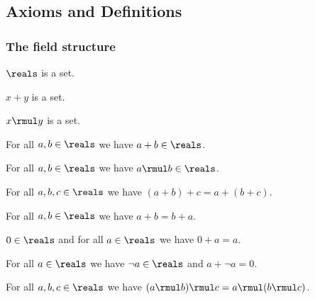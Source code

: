 \subsection{Axioms and Definitions}

\subsubsection{The field structure}

\begin{signature} \label{sig1}
    $\reals$ is a set.
\end{signature}

\begin{signature} \label{sig3}
    $x + y$ is a set.
\end{signature}

\begin{signature} \label{sig4}
    $x \rmul y$ is a set.
\end{signature}

\begin{axiom}\label{real_add_closed}
    For all $a, b\in\reals$ we have $a + b\in\reals$.
\end{axiom}

\begin{axiom}\label{real_mul_closed}
    For all $a, b\in\reals$ we have $a \rmul b\in\reals$.
\end{axiom}

\begin{axiom}\label{real_add_assoc}
    For all $a, b, c\in\reals$ we have $(a + b) + c = a + (b + c)$.
\end{axiom}

\begin{axiom}\label{real_add_comm}
    For all $a, b\in\reals$ we have $a + b = b + a$.
\end{axiom}

\begin{axiom}\label{real_add_ident}
    $0\in\reals$ and for all $a\in\reals$ we have $0 + a = a$.
\end{axiom}

\begin{axiom}\label{real_add_inverse}
    For all $a\in\reals$ we have $\neg{a}\in\reals$ and $a + \neg{a} = 0$.
\end{axiom}

\begin{axiom}\label{real_mul_assoc}
    For all $a, b, c\in\reals$ we have $(a \rmul b) \rmul c = a \rmul (b \rmul c)$.
\end{axiom}

